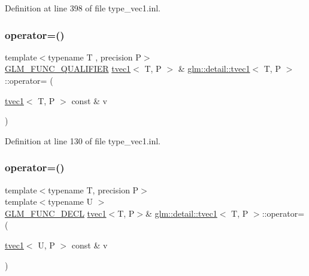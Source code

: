 Definition at line 398 of file type\+\_\+vec1.\+inl.

\mbox{\label{structglm_1_1detail_1_1tvec1_a1e15e21ac8d2986fde39e7553fc41d8a}} 
\subsubsection{\texorpdfstring{operator=()}{operator=()}\hspace{0.1cm}{\footnotesize\ttfamily [1/3]}}
{\footnotesize\ttfamily template$<$typename T , precision P$>$ \\
\hyperlink{setup_8hpp_a33fdea6f91c5f834105f7415e2a64407}{G\+L\+M\+\_\+\+F\+U\+N\+C\+\_\+\+Q\+U\+A\+L\+I\+F\+I\+ER} \hyperlink{structglm_1_1detail_1_1tvec1}{tvec1}$<$ T, P $>$ \& \hyperlink{structglm_1_1detail_1_1tvec1}{glm\+::detail\+::tvec1}$<$ T, P $>$\+::operator= (\begin{DoxyParamCaption}\item[{\hyperlink{structglm_1_1detail_1_1tvec1}{tvec1}$<$ T, P $>$ const \&}]{v }\end{DoxyParamCaption})}



Definition at line 130 of file type\+\_\+vec1.\+inl.

\mbox{\label{structglm_1_1detail_1_1tvec1_ae2928514df11c9bd6a89ed04ee2c57f7}} 
\subsubsection{\texorpdfstring{operator=()}{operator=()}\hspace{0.1cm}{\footnotesize\ttfamily [2/3]}}
{\footnotesize\ttfamily template$<$typename T, precision P$>$ \\
template$<$typename U $>$ \\
\hyperlink{setup_8hpp_ab2d052de21a70539923e9bcbf6e83a51}{G\+L\+M\+\_\+\+F\+U\+N\+C\+\_\+\+D\+E\+CL} \hyperlink{structglm_1_1detail_1_1tvec1}{tvec1}$<$T, P$>$\& \hyperlink{structglm_1_1detail_1_1tvec1}{glm\+::detail\+::tvec1}$<$ T, P $>$\+::operator= (\begin{DoxyParamCaption}\item[{\hyperlink{structglm_1_1detail_1_1tvec1}{tvec1}$<$ U, P $>$ const \&}]{v }\end{DoxyParamCaption})}


